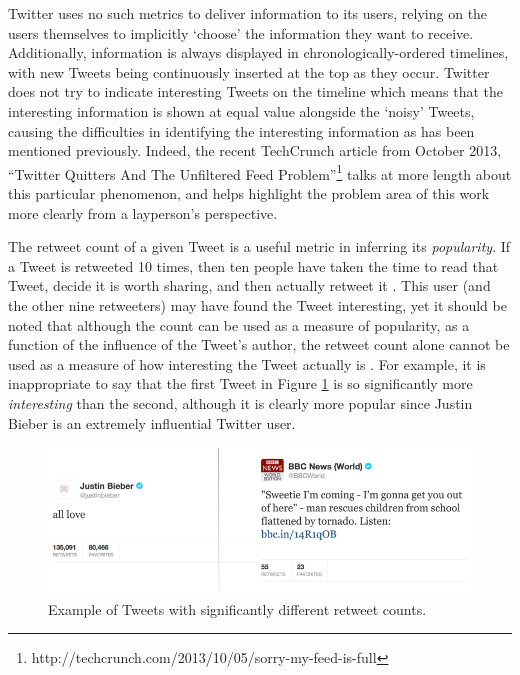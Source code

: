 Twitter uses no such metrics to deliver information to its users, relying on the users themselves to implicitly `choose' the information they want to receive. Additionally, information is always displayed in chronologically-ordered timelines, with new Tweets being continuously inserted at the top as they occur. Twitter does not try to indicate interesting Tweets on the timeline which means that the interesting information is shown at equal value alongside the `noisy' Tweets, causing the difficulties in identifying the interesting information as has been mentioned previously. Indeed, the recent TechCrunch article from October 2013, ``Twitter Quitters And The Unfiltered Feed Problem''\footnote{http://techcrunch.com/2013/10/05/sorry-my-feed-is-full} talks at more length about this particular phenomenon, and helps highlight the problem area of this work more clearly from a layperson's perspective.

The retweet count of a given Tweet is a useful metric in inferring its \textit{popularity}. If a Tweet is retweeted 10 times, then ten people have taken the time to read that Tweet, decide it is worth sharing, and then actually retweet it \cite{uysal11}. This user (and the other nine retweeters) may have found the Tweet interesting, yet it should be noted that although the count can be used as a measure of popularity, as a function of the influence of the Tweet's author, the retweet count alone cannot be used as a measure of how interesting the Tweet actually is \cite{naveed11}. For example, it is inappropriate to say that the first Tweet in Figure \ref{fig:tweet_comparison} is so significantly more \textit{interesting} than the second, although it is clearly more popular since Justin Bieber is an extremely influential Twitter user.

\begin{figure}[h]
\centering
\includegraphics[scale=0.55]{2.Background/Media/compared_tweets.png} 
\caption{Example of Tweets with significantly different retweet counts.}
\label{fig:tweet_comparison}
\end{figure}

